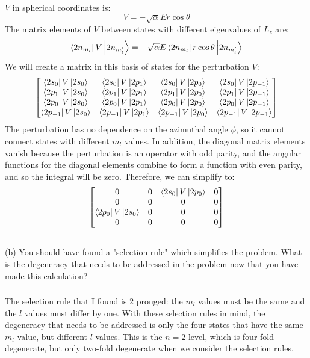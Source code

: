 \documentclass[12pt]{article}
\begin{document}
$V$ in spherical coordinates is:
\begin{equation}
  V = -\sqrt{\alpha} E r \cos \theta
\end{equation}
The matrix elements of $V$ between states with different eigenvalues of $L_z$ are:
\begin{equation}
  \bra{2n_{m_l}}V\ket{2n_{m_l'}} = -\sqrt{\alpha} E \bra{2n_{m_l}}r \cos \theta\ket{2n_{m_l'}}
\end{equation}
We will create a matrix in this basis of states for the perturbation $V$:
\begin{equation}
  \begin{bmatrix}
    \bra{2s_{0}}V\ket{2s_{0}} & \bra{2s_{0}}V\ket{2p_{1}} & \bra{2s_{0}}V\ket{2p_{0}} & \bra{2s_{0}}V\ket{2p_{-1}} \\
    \bra{2p_{1}}V\ket{2s_{0}} & \bra{2p_{1}}V\ket{2p_{1}} & \bra{2p_{1}}V\ket{2p_{0}} & \bra{2p_{1}}V\ket{2p_{-1}} \\
    \bra{2p_{0}}V\ket{2s_{0}} & \bra{2p_{0}}V\ket{2p_{1}} & \bra{2p_{0}}V\ket{2p_{0}} & \bra{2p_{0}}V\ket{2p_{-1}} \\
    \bra{2p_{-1}}V\ket{2s_{0}} & \bra{2p_{-1}}V\ket{2p_{1}} & \bra{2p_{-1}}V\ket{2p_{0}} & \bra{2p_{-1}}V\ket{2p_{-1}}
  \end{bmatrix}
\end{equation}
The perturbation has no dependence on the azimuthal angle $\phi$, so it cannot connect states with different $m_l$ values. In addition, the diagonal matrix elements vanish because the perturbation is an operator with odd parity, and the angular functions for the diagonal elements combine to form a function with even parity, and so the integral will be zero. Therefore, we can simplify to:
\begin{equation}
  \begin{bmatrix}
    0 & 0 & \bra{2s_{0}}V\ket{2p_{0}} & 0 \\
    0 & 0 & 0 & 0 \\
    \bra{2p_{0}}V\ket{2s_{0}} & 0 & 0 & 0 \\
    0 & 0 & 0 & 0
  \end{bmatrix}
\end{equation}
\subsection{}
(b) You should have found a "selection rule" which simplifies the problem. What is the degeneracy that needs to be addressed in the problem now that you have made this calculation?
\subsubsection{}
The selection rule that I found is 2 pronged: the $m_l$ values must be the same and the $l$ values must differ by one. With these selection rules in mind, the degeneracy that needs to be addressed is only the four states that have the same $m_l$ value, but different $l$ values. This is the $n = 2$ level, which is four-fold degenerate, but only two-fold degenerate when we consider the selection rules.
\end{document}
